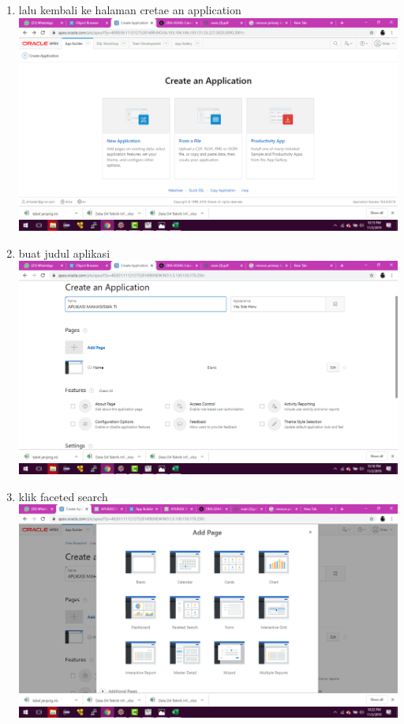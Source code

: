 \begin{enumerate}
\item lalu kembali ke halaman cretae an application\\
\includegraphics[scale= 0.3]{gambar/10.png}\\
\item buat judul aplikasi\\
\includegraphics[scale= 0.3]{gambar/11.png}\\
\item klik faceted search\\
\includegraphics[scale= 0.3]{gambar/12.png}\\

\end{enumerate}
